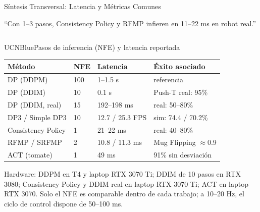 \documentclass[aspectratio=169,10pt,xcolor={dvipsnames,table}]{beamer}
\newcommand{\BannerFont}{\fontsize{7.5}{9.2}\selectfont\bfseries}       %
\newcommand{\BannerArc}{1.5pt}             %
\newcommand{\BannerRule}{0.5pt}            %
\newcommand{\BannerLeftRule}{2.5pt}        %
\newcommand{\CardHeightTall}{46mm}         %
\newcommand{\BannerCentral}[2][UCNCyan]{%
  \begin{tcolorbox}[
    enhanced,
    colback=#1!10,
    colframe=#1,
    boxrule=\BannerRule,
    leftrule=\BannerLeftRule,
    arc=\BannerArc,
    top=0.35mm, bottom=0.35mm, left=2mm, right=2mm
  ]
    {\BannerFont\raggedright\textcolor{UCNBlue}{#2}\par}
  \end{tcolorbox}%
  \vspace{-2.5mm}%
}
\newcommand{\BannerRef}[1]{{\mdseries\fontsize{5}{6}\selectfont\textcolor{TextDark!65}{\cite{#1}}}} %
\newcommand{\TabFont}{\fontsize{5.3}{6.4}\selectfont}                    %
\begin{document}
\begin{frame}{Síntesis Transversal: Latencia y Métricas Comunes}
  \BannerCentral[UCNBlue]{``Con 1--3 pasos, Consistency Policy y RFMP infieren en 11--22 ms en robot real.'' \BannerRef{prasad2024consistency,ding2025rfmp}}
  \vspace{0.8mm}
  \begin{columns}[T, onlytextwidth]
    \begin{column}{0.52\textwidth}
      \begin{Card}[height=\CardHeightTall]{UCNBlue}{Pasos de inferencia (NFE) y latencia reportada}
        {\TabFont
        \setlength{\tabcolsep}{1.4pt}
        \renewcommand{\arraystretch}{1.12}
        \begin{tabular}{@{}L{22mm} C{8mm} L{20mm} L{21mm}@{}}
          \toprule
          \textbf{Método} & \textbf{NFE} & \textbf{Latencia} & \textbf{Éxito asociado} \\
          \midrule
          DP (DDPM) & 100 & 1--1.5 s & referencia \\
          DP (DDIM) & 10 & 0.1 s & Push-T real: 95\% \\
          DP (DDIM, real) & 15 & 192--198 ms & real: 50--80\% \\
          DP3 / Simple DP3 & 10 & 12.7 / 25.3 FPS & sim: 74.4 / 70.2\% \\
           Consistency Policy & 1 & 21--22 ms & real: 40--80\% \\
           RFMP / SRFMP & 2 & 10.8 / 11.3 ms & Mug Flipping $\approx$0.9 \\
          ACT (tomate) & 1 & 49 ms & 91\% sin desviación \\
          \bottomrule
        \end{tabular}\par
        \vspace{1mm}
        \textcolor{TextDark!80}{Hardware: DDPM en T4 y laptop RTX 3070 Ti; DDIM de 10 pasos en RTX 3080; Consistency Policy y DDIM real en laptop RTX 3070 Ti; ACT en laptop RTX 3070. Solo el NFE es comparable dentro de cada trabajo; a 10--20 Hz, el ciclo de control dispone de 50--100 ms.}\par
        \vspace{0.6mm}
}
\end{Card}
\end{column}
\end{columns}
\end{frame}
\end{document}
